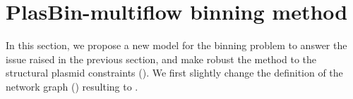 \section{PlasBin-multiflow binning method}\label{sec:pbmf}

In this section, we propose a new model for the binning problem to answer the issue raised in the previous section, and make robust the method to the structural plasmid constraints ().
We first slightly change the definition of the network graph () resulting to .


